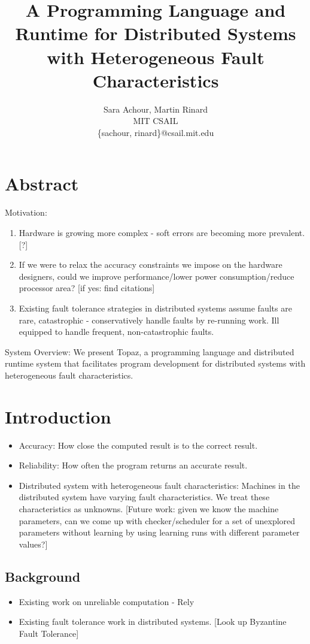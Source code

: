 \documentclass[11pt,twocolumn]{article}
\title{\textbf{A Programming Language and Runtime for Distributed Systems with Heterogeneous Fault Characteristics }}
\author{Sara Achour, Martin Rinard\\
		MIT CSAIL\\
		\{sachour, rinard\}@csail.mit.edu}
\date{}
\begin{document}
\maketitle
{}
\section{Abstract}
Motivation:
\begin{enumerate}
	\item Hardware is growing more complex - soft errors are becoming more prevalent. [?]
	\item If we were to relax the accuracy constraints we impose on the hardware designers, could we improve performance/lower power consumption/reduce processor area? [if yes: find citations]
	\item Existing fault tolerance strategies in distributed systems assume faults are rare, catastrophic - conservatively handle faults by re-running work. Ill equipped to handle frequent, non-catastrophic faults.
\end{enumerate}
System Overview:
We present Topaz, a programming language and distributed runtime system that facilitates program development for distributed systems with heterogeneous fault characteristics. 

\section{Introduction}
\begin{itemize}
	\item Accuracy: How close the computed result is to the correct result.
	\item Reliability: How often the program returns an accurate result.
	\item Distributed system with heterogeneous fault characteristics: Machines in the distributed system have varying fault characteristics. We treat these characteristics as unknowns. [Future work: given we know the machine parameters, can we come up with checker/scheduler for a set of unexplored parameters without learning by using learning runs with different parameter values?]
\end{itemize}
\subsection {Background}
\begin{itemize}
	\item Existing work on unreliable computation - Rely
	\item Existing fault tolerance work in distributed systems. [Look up Byzantine Fault Tolerance]
\end{itemize}
\end{document}
